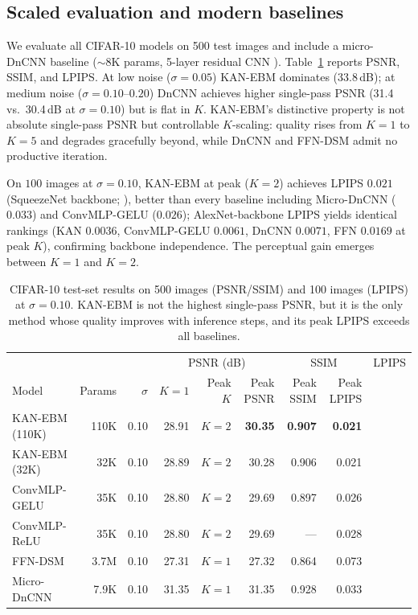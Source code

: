 \documentclass{article}
\begin{document}
\subsection{Scaled evaluation and modern baselines}
\label{sec:scaled}
We evaluate all CIFAR-10 models on 500 test images and include a micro-DnCNN baseline ($\sim$8K params, 5-layer residual CNN \citep{zhang2017}). Table~\ref{tab:scaled500} reports PSNR, SSIM, and LPIPS. At low noise ($\sigma{=}0.05$) KAN-EBM dominates (33.8\,dB); at medium noise ($\sigma{=}0.10$--$0.20$) DnCNN achieves higher single-pass PSNR (31.4 vs.~30.4\,dB at $\sigma{=}0.10$) but is flat in $K$. KAN-EBM's distinctive property is not absolute single-pass PSNR but controllable $K$-scaling: quality rises from $K{=}1$ to $K{=}5$ and degrades gracefully beyond, while DnCNN and FFN-DSM admit no productive iteration.

On $100$ images at $\sigma{=}0.10$, KAN-EBM at peak ($K{=}2$) achieves LPIPS $0.021$ (SqueezeNet backbone; \citealt{zhang2018perceptual}), better than every baseline including Micro-DnCNN ($0.033$) and ConvMLP-GELU ($0.026$); AlexNet-backbone LPIPS yields identical rankings (KAN $0.0036$, ConvMLP-GELU $0.0061$, DnCNN $0.0071$, FFN $0.0169$ at peak $K$), confirming backbone independence. The perceptual gain emerges between $K{=}1$ and $K{=}2$.

\begin{table}[h]
\centering\small
\begin{tabular}{lrr|rrr|rrr}
\toprule
& & & \multicolumn{3}{c|}{PSNR (dB)} & \multicolumn{2}{c|}{SSIM} & LPIPS \\
Model & Params & $\sigma$ & $K{=}1$ & Peak $K$ & Peak PSNR & Peak SSIM & Peak LPIPS \\
\midrule
KAN-EBM (110K) & 110K & 0.10 & 28.91 & $K{=}2$ & \textbf{30.35} & \textbf{0.907} & \textbf{0.021} \\
KAN-EBM (32K)  & 32K  & 0.10 & 28.89 & $K{=}2$ & 30.28 & 0.906 & 0.021 \\
ConvMLP-GELU   & 35K  & 0.10 & 28.80 & $K{=}2$ & 29.69 & 0.897 & 0.026 \\
ConvMLP-ReLU   & 35K  & 0.10 & 28.80 & $K{=}2$ & 29.69 & --- & 0.028 \\
FFN-DSM        & 3.7M & 0.10 & 27.31 & $K{=}1$ & 27.32 & 0.864 & 0.073 \\
Micro-DnCNN    & 7.9K & 0.10 & 31.35 & $K{=}1$ & 31.35 & 0.928 & 0.033 \\
\bottomrule
\end{tabular}
\caption{CIFAR-10 test-set results on 500 images (PSNR/SSIM) and 100 images (LPIPS) at $\sigma{=}0.10$. KAN-EBM is not the highest single-pass PSNR, but it is the only method whose quality improves with inference steps, and its peak LPIPS exceeds all baselines.}
\label{tab:scaled500}
\end{table}
\end{document}
